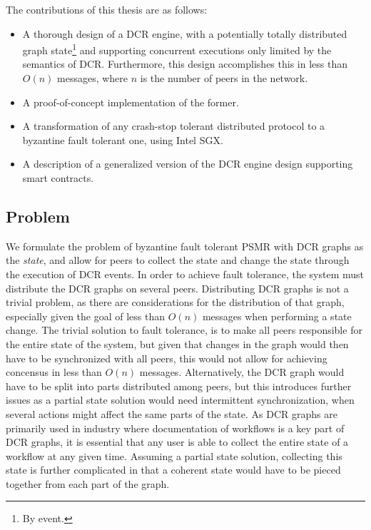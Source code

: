 \documentclass{article}
\begin{document}
	\noindent The contributions of this thesis are as follows:
	\begin{itemize}
		\item A thorough design of a DCR engine, with a potentially totally distributed graph state\footnote{By event.} and supporting concurrent executions only limited by the semantics of DCR.
		Furthermore, this design accomplishes this in less than $O(n)$ messages, where $n$ is the number of peers in the network.
		\item A proof-of-concept implementation of the former.
		\item A transformation of any crash-stop tolerant distributed protocol to a byzantine fault tolerant one, using Intel SGX.
		\item A description of a generalized version of the DCR engine design supporting smart contracts.
	\end{itemize}

	\subsection{Problem}

	We formulate the problem of byzantine fault tolerant PSMR with DCR graphs as the \textit{state}, and allow for peers to collect the state and change the state through the execution of DCR events.
	In order to achieve fault tolerance, the system must distribute the DCR graphs on several peers.
	Distributing DCR graphs is not a trivial problem, as there are considerations for the distribution of that graph, especially given the goal of less than $O(n)$ messages when performing a state change.
	The trivial solution to fault tolerance, is to make all peers responsible for the entire state of the system, but given that changes in the graph would then have to be synchronized with all peers, this would not allow for achieving concensus in less than $O(n)$ messages.
	Alternatively, the DCR graph would have to be split into parts distributed among peers, but this introduces further issues as a partial state solution would need intermittent synchronization, when several actions might affect the same parts of the state.
	As DCR graphs are primarily used in industry where documentation of workflows is a key part of DCR graphs, it is essential that any user is able to collect the entire state of a workflow at any given time.
	Assuming a partial state solution, collecting this state is further complicated in that a coherent state would have to be pieced together from each part of the graph.
\end{document}
